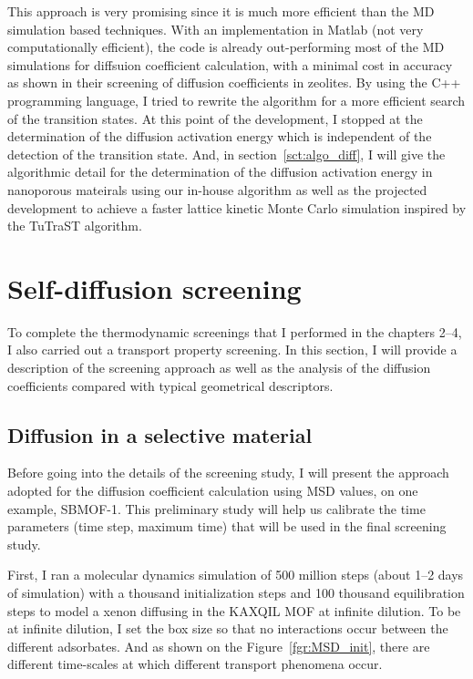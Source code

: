 \documentclass[main]{subfiles}
\begin{document}
This approach is very promising since it is much more efficient than the MD simulation based techniques. With an implementation in Matlab (not very computationally efficient), the code is already out-performing most of the MD simulations for diffsuion coefficient calculation, with a minimal cost in accuracy as shown in their screening of diffusion coefficients in zeolites. By using the C++ programming language, I tried to rewrite the algorithm for a more efficient search of the transition states. At this point of the development, I stopped at the determination of the diffusion activation energy which is independent of the detection of the transition state. And, in section~\ref{sct:algo_diff}, I will give the algorithmic detail for the determination of the diffusion activation energy in nanoporous mateirals using our in-house algorithm as well as the projected development to achieve a faster lattice kinetic Monte Carlo simulation inspired by the TuTraST algorithm.


\section{Self-diffusion screening}\label{sct:md_screening}

To complete the thermodynamic screenings that I performed in the chapters 2--4, I also carried out a transport property screening. In this section, I will provide a description of the screening approach as well as the analysis of the diffusion coefficients compared with typical geometrical descriptors.

\subsection{Diffusion in a selective material}

Before going into the details of the screening study, I will present the approach adopted for the diffusion coefficient calculation using MSD values, on one example, SBMOF-1\autocite{Banerjee_2016}. This preliminary study will help us calibrate the time parameters (time step, maximum time) that will be used in the final screening study.

First, I ran a molecular dynamics simulation of 500 million steps (about 1--2 days of simulation) with a thousand initialization steps and 100 thousand equilibration steps to model a xenon diffusing in the KAXQIL\autocite{Banerjee2012} MOF at infinite dilution. To be at infinite dilution, I set the box size so that no interactions occur between the different adsorbates. And as shown on the Figure~\ref{fgr:MSD_init}, there are different time-scales at which different transport phenomena occur. 
\end{document}
